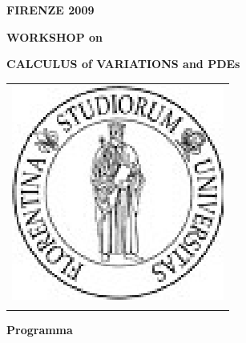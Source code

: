 \documentclass[12pt]{article}
\begin{document}
\begin{center}
\centerline{\large{\bf FIRENZE 2009}}
\vspace*{0.1truein}
\centerline{\Large{\bf WORKSHOP on}}
\vspace*{0.05truein}
\centerline{\Large{\bf CALCULUS of VARIATIONS and PDEs}}
\vspace*{0.25truein}
%
%
 \begin{tabular}{c}
  \includegraphics[scale=0.7]{logo.eps} \\
  \\
 \end{tabular}
\end{center}

\centerline{\small{\bf Programma}}
\vspace*{0.25truein}



%
%
\end{document}
